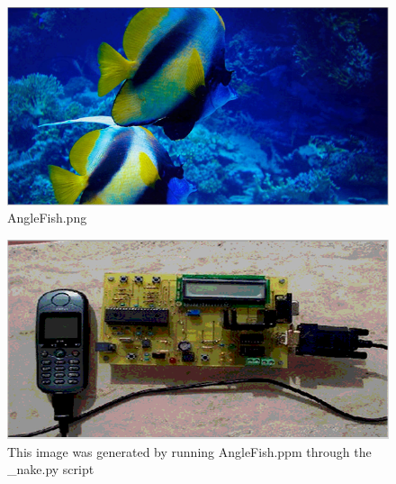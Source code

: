 \documentclass[12pt]{article}
\begin{document}
				\begin{figure}[ht!]
					\centering
					\includegraphics[width=12cm]{Images/AngleFishPng.png}
					\caption{AngleFish.png}
				\end{figure}

				\begin{figure}[ht!]
					\centering
					\includegraphics[width=12cm]{Images/decrypt.png}
					\caption{This image was generated by running AngleFish.ppm through the \_nake.py script}
				\end{figure}

	
\end{document}

